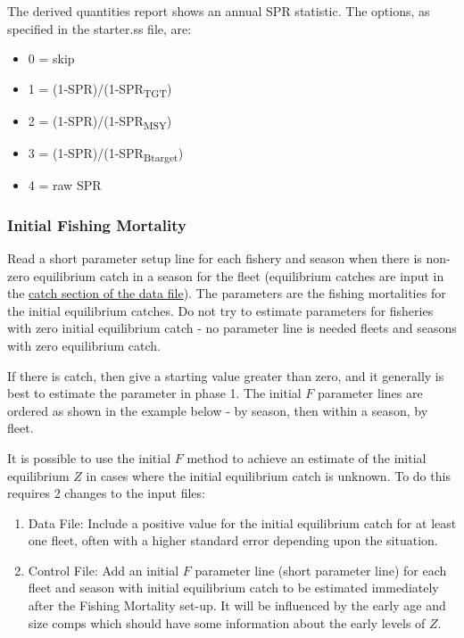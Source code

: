 The derived quantities report shows an annual SPR statistic. The options, as specified in the starter.ss file, are:
\begin{itemize}
	\item 0 = skip
	\item 1 = (1-SPR)/(1-SPR\textsubscript{TGT})
	\item 2 = (1-SPR)/(1-SPR\textsubscript{MSY})
	\item 3 = (1-SPR)/(1-SPR\textsubscript{Btarget})
	\item 4 = raw SPR
\end{itemize}

\hypertarget{InitF}{}
\subsubsection{Initial Fishing Mortality}
Read a short parameter setup line for each fishery and season when there is non-zero equilibrium catch in a season for the fleet (equilibrium catches are input in the \hyperlink{CatchFormat}{catch section of the data file}). The parameters are the fishing mortalities for the initial equilibrium catches. Do not try to estimate parameters for fisheries with zero initial equilibrium catch - no parameter line is needed fleets and seasons with zero equilibrium catch.

If there is catch, then give a starting value greater than zero, and it generally is best to estimate the parameter in phase 1. The initial $F$ parameter lines are ordered as shown in the example below - by season, then within a season, by fleet.

It is possible to use the initial $F$ method to achieve an estimate of the initial equilibrium $Z$ in cases where the initial equilibrium catch is unknown. To do this requires 2 changes to the input files:
\begin{enumerate}
	\item Data File: Include a positive value for the initial equilibrium catch for at least one fleet, often with a higher standard error depending upon the situation.
	\item Control File: Add an initial $F$ parameter line (short parameter line) for each fleet and season with initial equilibrium catch to be estimated immediately after the Fishing Mortality set-up. It will be influenced by the early age and size comps which should have some information about the early levels of $Z$.
\end{enumerate}

